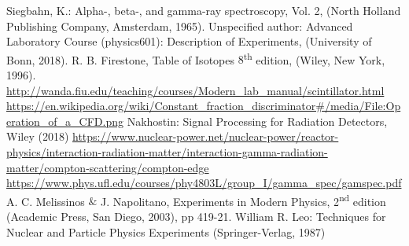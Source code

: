 \documentclass[twocolumn]{article}
\begin{document}
\newpage
\begin{thebibliography}{9}

Siegbahn, K.: Alpha-, beta-, and gamma-ray spectroscopy, Vol. 2, (North Holland Publishing Company, Amsterdam, 1965).
Unspecified author: Advanced Laboratory Course (physics601): Description of Experiments, (University of Bonn, 2018).
R. B. Firestone, Table of Isotopes $8$\textsuperscript{th} edition, (Wiley, New York, 1996).
 \url{http://wanda.fiu.edu/teaching/courses/Modern_lab_manual/scintillator.html}
\url{https://en.wikipedia.org/wiki/Constant_fraction_discriminator#/media/File:Operation_of_a_CFD.png}
Nakhostin: Signal Processing for Radiation Detectors, Wiley (2018)
\url{https://www.nuclear-power.net/nuclear-power/reactor-physics/interaction-radiation-matter/interaction-gamma-radiation-matter/compton-scattering/compton-edge}
\url{https://www.phys.ufl.edu/courses/phy4803L/group_I/gamma_spec/gamspec.pdf}
A. C. Melissinos $\&$ J. Napolitano, Experiments in Modern Physics, 2\textsuperscript{nd} edition (Academic Press, San Diego, 2003), pp 419-21.
William R. Leo: Techniques for Nuclear and Particle Physics Experiments (Springer-Verlag, 1987)
\end{thebibliography}
\end{document}

